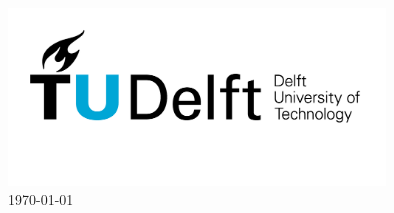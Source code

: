 \begin{titlepage}
\includegraphics[width=100mm]{logo.jpg}\\[1cm] %


{\large \today}\\[3cm] %

\vfill %

\end{titlepage}

